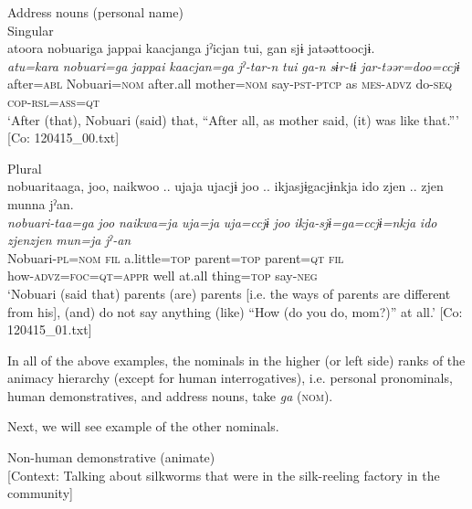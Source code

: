   Address nouns (personal name)\\

\ex  Singular\\

{\TM}
\glll atoora  nobuariga  jappai  {\textbar}kaacjan{\textbar}ga  jˀicjan   tui,  gan  sjɨ  jatəəttoocjɨ.\\
      \textit{atu=kara}  \textit{nobuari=ga}  \textit{jappai}  \textit{kaacjan=ga}  \textit{jˀ-tar-n}   \textit{tui}  \textit{ga-n}  \textit{sɨr-tɨ}  \textit{jar-təər=doo=ccjɨ}
      after=\textsc{abl}  Nobuari=\textsc{nom}  after.all  mother=\textsc{nom}  say-\textsc{pst}-\textsc{ptcp}      as  \textsc{mes}-\textsc{advz}  do-\textsc{seq}  \textsc{cop}-\textsc{rsl}=\textsc{ass}=\textsc{qt}\\
\glt ‘After (that), Nobuari (said) that, “After all, as mother said, (it) was like that.”’ [Co: 120415\_00.txt]
\z

\ex  Plural\\

{\TM}
\glll nobuaritaaga,  joo,  naikwoo ..  ujaja  ujacjɨ  joo ..   ikjasjɨgacjɨnkja  ido  zjen .. zjen  munna  jˀan.\\
      \textit{nobuari-taa=ga}  \textit{joo}  \textit{naikwa=ja}  \textit{uja=ja}  \textit{uja=ccjɨ}  \textit{joo}  \textit{ikja-sjɨ=ga=ccjɨ=nkja}  \textit{ido}  \textit{zjenzjen}  \textit{mun=ja}  \textit{jˀ-an}\\
      Nobuari-\textsc{pl}=\textsc{nom}  \textsc{fil}  a.little=\textsc{top}  parent=\textsc{top}  parent=\textsc{qt}  \textsc{fil}\\
      how-\textsc{advz}=\textsc{foc}=\textsc{qt}=\textsc{appr}  well  at.all  thing=\textsc{top}  say-\textsc{neg}\\
\glt ‘Nobuari (said that) parents (are) parents [i.e. the ways of parents are different from his], (and) do not say anything (like) “How (do you do, mom?)” at all.’ [Co: 120415\_01.txt]
\z

In all of the above examples, the nominals in the higher (or left side) ranks of the animacy hierarchy (except for human interrogatives), i.e. personal pronominals, human demonstratives, and address nouns, take \textit{ga} (\textsc{nom}).

  Next, we will see example of the other nominals.

\ea\label{ex:6-118}
\ea Non-human demonstrative (animate)\\{}
[Context: Talking about silkworms that were in the silk-reeling factory in the community]

